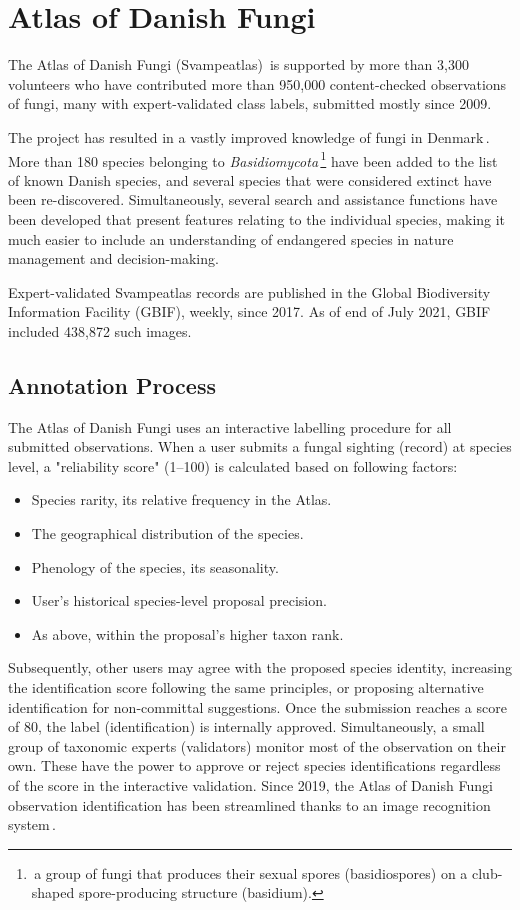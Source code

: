 \documentclass[10pt,twocolumn,letterpaper]{article}
\begin{document}
\section{Atlas of Danish Fungi}

The Atlas of Danish Fungi (Svampeatlas)\,\cite{svampe_databasen, svampeatlas_data, heilmann2019citizen} is supported by more than 3,300 volunteers who have contributed more than 950,000 content-checked observations of fungi,
many with expert-validated class labels, submitted mostly since 2009.


The project has resulted in a vastly improved knowledge of fungi in Denmark\,\cite{heilmann2019citizen}. 
More than 180 species belonging to \textit{Basidiomycota}\,\footnote{\,a group of fungi that produces their sexual spores (basidiospores) on a club-shaped spore-producing structure (basidium).} have been added to the list of known Danish species, and several species that were considered extinct have been re-discovered. Simultaneously, several search and assistance functions have been developed that present features relating to the individual species, making it much easier to include an understanding of endangered species in nature management and decision-making.

Expert-validated Svampeatlas records are published in the Global Biodiversity Information Facility (GBIF), weekly, since 2017. As of end of July 2021, GBIF included 438,872 such images.

\subsection{Annotation Process}

The Atlas of Danish Fungi uses an interactive labelling procedure for all submitted observations. When a user submits a fungal sighting (record) at species level, a "reliability score" (1--100) is calculated based on following factors:
\begin{itemize}[noitemsep,topsep=0pt,leftmargin=0.5cm]
    \item Species rarity, \ie its relative frequency in the Atlas.
    \item The geographical distribution of the species.
    \item Phenology of the species, its seasonality.
    \item User's historical species-level proposal precision.
    \item As above, within the proposal's higher taxon rank.
\end{itemize}
Subsequently, other users may agree with the proposed species identity, increasing the identification score following the same principles, or proposing alternative identification for non-committal suggestions.  Once the submission reaches a score of 80, the label (identification) is internally approved. Simultaneously, a small group of taxonomic experts (validators) monitor most of the observation on their own. These have the power to approve or reject species identifications regardless of the score in the interactive validation. 
Since 2019, the Atlas of Danish Fungi observation identification has been  streamlined thanks to an image recognition system\,\cite{fungiUsecase}.
\end{document}
